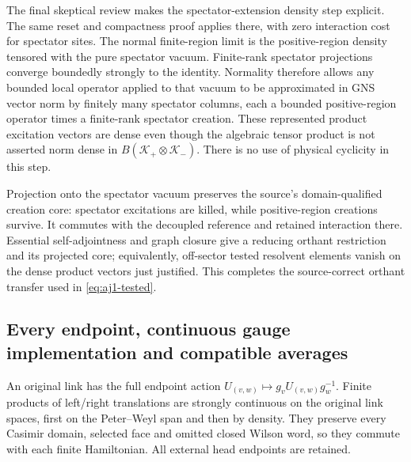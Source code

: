 The final skeptical review makes the spectator-extension density step explicit. The same reset and compactness proof applies there, with zero interaction cost for spectator sites. The normal finite-region limit is the positive-region density tensored with the pure spectator vacuum. Finite-rank spectator projections converge boundedly strongly to the identity. Normality therefore allows any bounded local operator applied to that vacuum to be approximated in GNS vector norm by finitely many spectator columns, each a bounded positive-region operator times a finite-rank spectator creation. These represented product excitation vectors are dense even though the algebraic tensor product is not asserted norm dense in $B(\mathcal K_+\otimes\mathcal K_-)$. There is no use of physical cyclicity in this step.

Projection onto the spectator vacuum preserves the source's domain-qualified creation core: spectator excitations are killed, while positive-region creations survive. It commutes with the decoupled reference and retained interaction there. Essential self-adjointness and graph closure give a reducing orthant restriction and its projected core; equivalently, off-sector tested resolvent elements vanish on the dense product vectors just justified. This completes the source-correct orthant transfer used in \eqref{eq:aj1-tested}.

\subsection{Every endpoint, continuous gauge implementation and compatible averages}
An original link has the full endpoint action $U_{(v,w)}\mapsto g_vU_{(v,w)}g_w^{-1}$. Finite products of left/right translations are strongly continuous on the original link spaces, first on the Peter--Weyl span and then by density. They preserve every Casimir domain, selected face and omitted closed Wilson word, so they commute with each finite Hamiltonian. All external head endpoints are retained.

